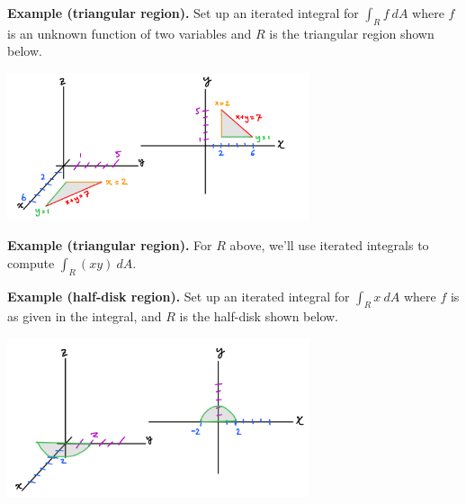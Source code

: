 \documentclass[12pt,letterpaper,noanswers]{exam}
\begin{document}

\noindent\textbf{Example (triangular region).}  Set up an iterated integral for $\int_R f\ dA$ where $f$ is an unknown function of two variables and $R$ is the triangular region shown below.

\includegraphics[width=3.5in]{img/C17p9-18.png}

\vfill

\noindent\textbf{Example (triangular region).}  For $R$ above, we'll use iterated integrals to compute $\int_R (xy)\ dA$.

\vfill




\noindent\textbf{Example (half-disk region).}  Set up an iterated integral for $\int_R x\ dA$ where $f$ is as given in the integral, and $R$ is the half-disk shown below. %

\includegraphics[width=3.5in]{img/C17p10-18.png}

\vspace{2in}
\end{document}
